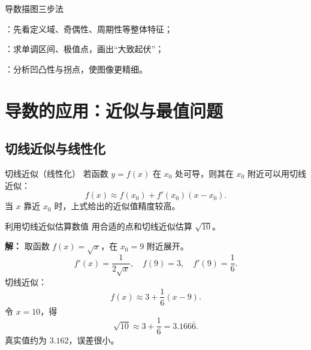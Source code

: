 \documentclass[a4paper,11pt]{ctexart}
\begin{document}
\begin{notebox}{导数描图三步法}
\begin{focuspoints}
  \item {}：先看定义域、奇偶性、周期性等整体特征；
  \item {}：求单调区间、极值点，画出“大致起伏”；
  \item {}：分析凹凸性与拐点，使图像更精细。
\end{focuspoints}
\end{notebox}

\begin{center}
\end{center}

\section{导数的应用：近似与最值问题}

\subsection{切线近似与线性化}

\begin{definitionbox}{切线近似（线性化）}
若函数 $y=f(x)$ 在 $x_0$ 处可导，则其在 $x_0$ 附近可以用切线近似：
\[
  f(x)\approx f(x_0)+f'(x_0)(x-x_0).
\]
当 $x$ 靠近 $x_0$ 时，上式给出的近似值精度较高。
\end{definitionbox}

\begin{examplebox}{利用切线近似估算数值}
用合适的点和切线近似估算 $\sqrt{10}$。

\textbf{解：}
取函数 $f(x)=\sqrt{x}$，在 $x_0=9$ 附近展开。
\[
  f'(x)=\dfrac{1}{2\sqrt{x}},\quad f(9)=3,\quad f'(9)=\dfrac{1}{6}.
\]
切线近似：
\[
  f(x)\approx 3+\dfrac{1}{6}(x-9).
\]
令 $x=10$，得
\[
  \sqrt{10}\approx 3+\dfrac{1}{6}=3.166\overline{6}.
\]
真实值约为 $3.162$，误差很小。
\end{examplebox}
\end{document}
